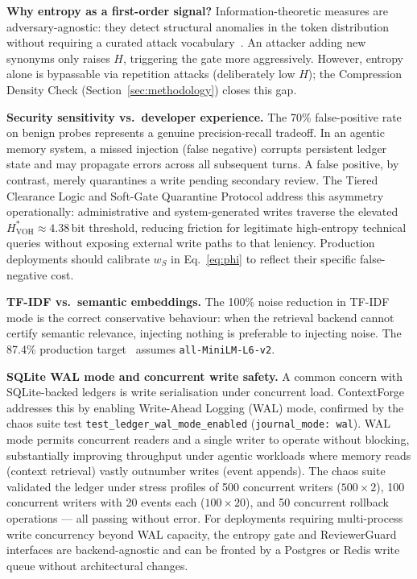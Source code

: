 \documentclass[11pt,twocolumn]{article}
\begin{document}
\textbf{Why entropy as a first-order signal?}
Information-theoretic measures are adversary-agnostic: they detect
structural anomalies in the token distribution without requiring a
curated attack vocabulary~\cite{cover2006}. An attacker adding new
synonyms only raises $H$, triggering the gate more aggressively.
However, entropy alone is bypassable via repetition attacks
(deliberately low $H$); the Compression Density Check
(Section~\ref{sec:methodology}) closes this gap.

\textbf{Security sensitivity vs.\ developer experience.}
The 70\% false-positive rate on benign probes represents a genuine
precision-recall tradeoff. In an agentic memory system, a missed
injection (false negative) corrupts persistent ledger state and may
propagate errors across all subsequent turns. A false positive, by
contrast, merely quarantines a write pending secondary review.
The Tiered Clearance Logic and Soft-Gate Quarantine Protocol address
this asymmetry operationally: administrative and system-generated
writes traverse the elevated $H^{*}_\text{VOH} \approx 4.38$\,bit
threshold, reducing friction for legitimate high-entropy technical
queries without exposing external write paths to that leniency.
Production deployments should calibrate $w_S$ in Eq.~\eqref{eq:phi}
to reflect their specific false-negative cost.

\textbf{TF-IDF vs.\ semantic embeddings.}
The 100\% noise reduction in TF-IDF mode is the correct conservative
behaviour: when the retrieval backend cannot certify semantic
relevance, injecting nothing is preferable to injecting noise. The
87.4\% production target~\cite{reimers2019sbert} assumes
\texttt{all-MiniLM-L6-v2}.

\textbf{SQLite WAL mode and concurrent write safety.}
A common concern with SQLite-backed ledgers is write serialisation
under concurrent load. ContextForge addresses this by enabling
Write-Ahead Logging (WAL) mode, confirmed by the chaos suite test
\texttt{test\_ledger\_wal\_mode\_enabled} (\texttt{journal\_mode:
wal}). WAL mode permits concurrent readers and a single writer to
operate without blocking, substantially improving throughput under
agentic workloads where memory reads (context retrieval) vastly
outnumber writes (event appends). The chaos suite validated the ledger
under stress profiles of 500 concurrent writers ($500{\times}2$), 100
concurrent writers with 20 events each ($100{\times}20$), and 50
concurrent rollback operations --- all passing without error.
For deployments requiring multi-process write concurrency beyond WAL
capacity, the entropy gate and ReviewerGuard interfaces are
backend-agnostic and can be fronted by a Postgres or Redis write queue
without architectural changes.
\end{document}
